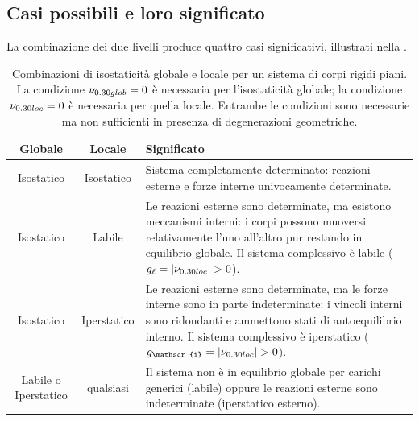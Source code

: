 \subsection{Casi possibili e loro significato}
\label{sec:casi_globale_locale}

La combinazione dei due livelli produce quattro casi
significativi, illustrati nella .

\begin{table}[ht]
	\centering
	\renewcommand{\arraystretch}{1.8}
	\small
	\begin{tabular}{ccp{8cm}}
		\toprule
		Globale & Locale & Significato \\
		\midrule
		Isostatico & Isostatico
		& Sistema completamente determinato: reazioni esterne
		e forze interne univocamente determinate. \\
		Isostatico & Labile
		& Le reazioni esterne sono determinate, ma esistono
		meccanismi interni: i corpi possono muoversi
		relativamente l'uno all'altro pur restando in
		equilibrio globale. Il sistema complessivo è labile
		($g_\ell = |\nu_{\rm loc}| > 0$). \\
		Isostatico & Iperstatico
		& Le reazioni esterne sono determinate, ma le forze
		interne sono in parte indeterminate: i vincoli interni
		sono ridondanti e ammettono stati di autoequilibrio
		interno. Il sistema complessivo è iperstatico
		($g_{\mathscr{i}} = |\nu_{\rm loc}| > 0$). \\
		Labile o Iperstatico & qualsiasi
		& Il sistema non è in equilibrio globale per carichi
		generici (labile) oppure le reazioni esterne sono
		indeterminate (iperstatico esterno). \\
		\bottomrule
	\end{tabular}
	\caption{Combinazioni di isostaticità globale e locale
		per un sistema di corpi rigidi piani.
		La condizione $\nu_{\rm glob} = 0$ è necessaria
		per l'isostaticità globale; la condizione
		$\nu_{\rm loc} = 0$ è necessaria per quella locale.
		Entrambe le condizioni sono necessarie ma non
		sufficienti in presenza di degenerazioni geometriche.}
	\label{tab:globale_locale}
\end{table}

